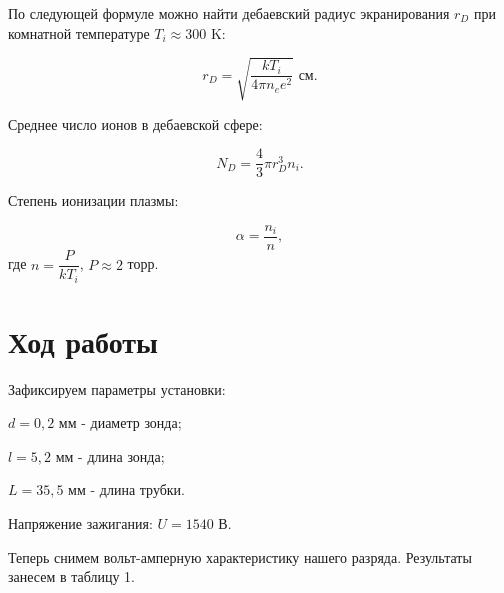 \documentclass[a4paper,12pt]{article} %
\begin{document}
По следующей формуле можно найти дебаевский радиус экранирования $r_D$ при комнатной температуре $T_i \approx 300$ K:

\begin{equation*}
	r_D = \sqrt{\dfrac{kT_i}{4\pi n_e e^2}} \text{ см}.
\end{equation*}

Среднее число ионов в дебаевской сфере:

\begin{equation*}
	N_D = \dfrac{4}{3}\pi r_D^3 n_i.
\end{equation*}

Степень ионизации плазмы:

\begin{equation*}
	\alpha = \dfrac{n_i}{n},
\end{equation*}
\noindent где $n = \dfrac{P}{kT_i}$, $P \approx 2$ торр. 

\newpage

\section*{Ход работы}

Зафиксируем параметры установки:

$d = 0,2$ мм - диаметр зонда;

$l = 5,2$ мм - длина зонда;

$L = 35,5$ мм - длина трубки.


Напряжение зажигания: $U = 1540$ В.
\vspace{5mm}

Теперь снимем вольт-амперную характеристику нашего разряда. Результаты занесем в таблицу 1.
\end{document}
